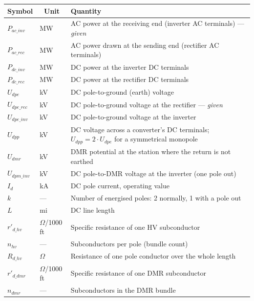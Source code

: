 \begin{table}[!ht]
  \centering
  \renewcommand{\arraystretch}{1.25}
  \begin{tabularx}{\linewidth}{@{}l l X@{}}
    \toprule
    \multicolumn{1}{c}{\textbf{Symbol}} & \multicolumn{1}{c}{\textbf{Unit}} & \textbf{Quantity} \\
    \midrule
    $P_{ac\_inv}$   & MW            & AC power at the receiving end (inverter AC terminals) --- \emph{given} \\
    $P_{ac\_rec}$   & MW            & AC power drawn at the sending end (rectifier AC terminals) \\
    $P_{dc\_inv}$   & MW            & DC power at the inverter DC terminals \\
    $P_{dc\_rec}$   & MW            & DC power at the rectifier DC terminals \\
    $U_{dpe}$      & kV            & DC pole-to-ground (earth) voltage \\
    $U_{dpe\_rec}$  & kV            & DC pole-to-ground voltage at the rectifier --- \emph{given} \\
    $U_{dpe\_inv}$  & kV            & DC pole-to-ground voltage at the inverter \\
    $U_{dpp}$      & kV            & DC voltage across a converter's DC terminals; $U_{dpp} = 2\cdot U_{dpe}$ for a symmetrical monopole \\
    $U_{dmr}$      & kV            & DMR potential at the station where the return is not earthed \\
    $U_{dpm\_inv}$  & kV            & DC pole-to-DMR voltage at the inverter (one pole out) \\
    $I_{d}$        & kA            & DC pole current, operating value \\
    $k$            & ---           & Number of energised poles: 2 normally, 1 with a pole out \\
    $L$            & mi            & DC line length \\
    $r'_{d\_hv}$      & $\Omega$/1000\,ft & Specific resistance of one HV subconductor \\
    $n_{hv}$       & ---           & Subconductors per pole (bundle count) \\
    $R_{d\_hv}$     & $\Omega$      & Resistance of one pole conductor over the whole length \\
    $r'_{d\_dmr}$     & $\Omega$/1000\,ft & Specific resistance of one DMR subconductor \\
    $n_{dmr}$      & ---           & Subconductors in the DMR bundle \\

\end{tabularx}
\end{table}
